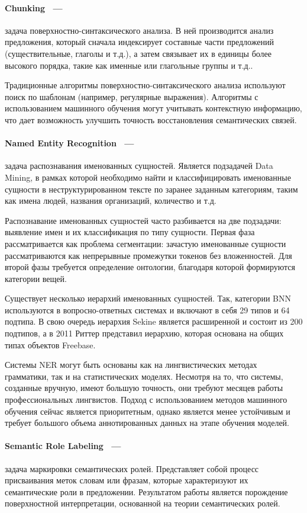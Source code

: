 \paragraph{Chunking  ~---}задача поверхностно-синтаксического анализа. В  ней производится анализ предложения, который сначала индексирует составные части предложений (существительные, глаголы и т.д.), а затем связывает их в единицы более высокого порядка, такие как именные или глагольные группы и т.д.. 

Традиционные алгоритмы поверхностно-синтаксического анализа используют поиск по шаблонам (например, регулярные выражения). Алгоритмы с использованием машинного обучения могут учитывать контекстную информацию, что дает возможность улучшить точность восстановления семантических связей.
\paragraph{Named Entity Recognition  ~---}задача распознавания именованных сущностей. 
Является подзадачей Data Mining, в рамках которой необходимо найти и классифицировать именованные сущности в неструктурированном тексте по заранее заданным категориям, таким как имена людей, названия организаций, количество и т.д.

Распознавание именованных сущностей часто разбивается на две подзадачи: выявление имен и их классификация по типу сущности. Первая фаза рассматривается как проблема сегментации: зачастую именованные сущности рассматриваются как непрерывные промежутки токенов без вложенностей. Для второй фазы требуется определение онтологии, благодаря которой формируются категории вещей.

Существует несколько иерархий именованных сущностей. Так, категории BNN используются в вопросно-ответных системах и включают в себя 29 типов и 64 подтипа. В свою очередь иерархия Sekine является расширенной и состоит из 200 подтипов, а в 2011 Риттер представил иерархию, которая основана на общих типах объектов Freebase. 

Системы NER могут быть основаны как на лингвистических методах грамматики, так и на статистических моделях. Несмотря на то, что системы, созданные вручную, имеют большую точность, они требуют месяцев работы профессиональных лингвистов. Подход с использованием методов машинного обучения сейчас является приоритетным, однако является менее устойчивым и требует большого объема аннотированных данных на этапе обучения моделей. 

\paragraph{Semantic Role Labeling  ~---}задача маркировки семантических ролей. Представляет собой процесс присваивания меток словам или фразам, которые характеризуют их семантические роли в предложении. Результатом работы является порождение поверхностной интерпретации, основанной на теории семантических ролей.


